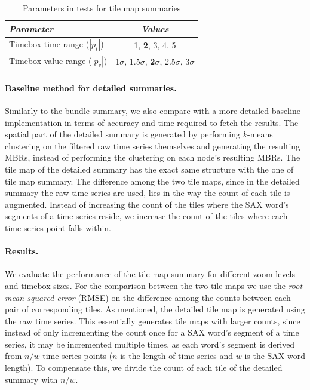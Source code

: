 \begin{table}[!ht]
\centering
\caption{Parameters in tests for tile map summaries}
\begin{small}
\begin{tabular}{lc} 
\hline
{\em Parameter} &{\em Values} \\
\hline
Timebox time range ($|p_t|$) & 1, {\bf 2}, 3, 4, 5 \\
Timebox value range ($|p_v|$) & 1$\sigma$, 1.5$\sigma$, {\bf 2$\sigma$}, 2.5$\sigma$, 3$\sigma$ \\
\hline
\end{tabular}
\end{small}
\label{tab:parameters2_vis}
\end{table}

\paragraph{Baseline method for detailed summaries.} Similarly to the bundle summary, we also compare with a more detailed baseline implementation in terms of accuracy and time required to fetch the results. The spatial part of the detailed summary is generated by performing $k$-means clustering on the filtered raw time series themselves and generating the resulting MBRs, instead of performing the clustering on each node's resulting MBRs. The tile map of the detailed summary has the exact same structure with the one of tile map summary. The difference among the two tile maps, since in the detailed summary the raw time series are used, lies in the way the count of each tile is augmented. Instead of increasing the count of the tiles where the SAX word's segments of a time series reside, we increase the count of the tiles where each time series point falls within.

\paragraph{Results.} We evaluate the performance of the tile map summary for different zoom levels and timebox sizes. For the comparison between the two tile maps we use the {\em root mean squared error} (RMSE) on the difference among the counts between each pair of corresponding tiles. As mentioned, the detailed tile map is generated using the raw time series. This essentially generates tile maps with larger counts, since instead of only incrementing the count once for a SAX word's segment of a time series, it may be incremented multiple times, as each word's segment is derived from $n/w$ time series points ($n$ is the length of time series and $w$ is the SAX word length). To compensate this, we divide the count of each tile of the detailed summary with $n/w$.

